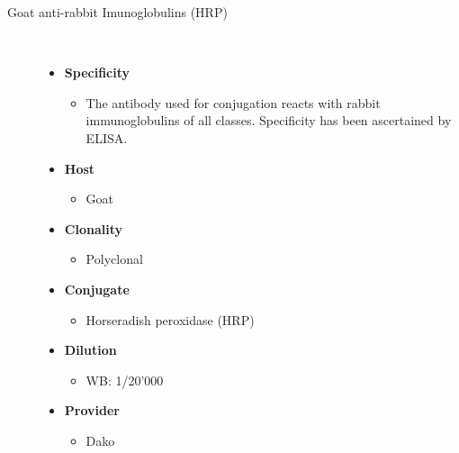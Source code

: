 \begin{description}
\item[Goat anti-rabbit Imunoglobulins (HRP)]~\par
 \begin{itemize}
      \item[] \textbf{Specificity}
      \begin{itemize}
         \item[]  The antibody used for conjugation reacts with rabbit immunoglobulins of all classes. Specificity has been ascertained by ELISA.
      \end{itemize}
      \item[] \textbf{Host}
      \begin{itemize}
      \item[] Goat
      \end{itemize}
            \item[] \textbf{Clonality}
      \begin{itemize}
      \item[] Polyclonal
      \end{itemize}
            \item[] \textbf{Conjugate}
      \begin{itemize}
      \item[]Horseradish peroxidase (HRP) 
      \end{itemize}
                  \item[] \textbf{Dilution}
      \begin{itemize}
      \item[]WB: 1/20'000 
      \end{itemize}       
                  \item[] \textbf{Provider}
      \begin{itemize}
      \item[] Dako
      \end{itemize}     
   \end{itemize}   


\end{description}
